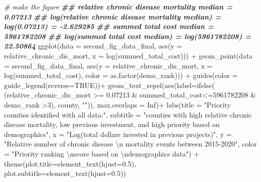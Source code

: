 \documentclass[
]{article}
\newenvironment{Shaded}{\begin{snugshade}}{\end{snugshade}}
\newcommand{\AttributeTok}[1]{\textcolor[rgb]{0.77,0.63,0.00}{#1}}
\newcommand{\CommentTok}[1]{\textcolor[rgb]{0.56,0.35,0.01}{\textit{#1}}}
\newcommand{\ConstantTok}[1]{\textcolor[rgb]{0.00,0.00,0.00}{#1}}
\newcommand{\DecValTok}[1]{\textcolor[rgb]{0.00,0.00,0.81}{#1}}
\newcommand{\DocumentationTok}[1]{\textcolor[rgb]{0.56,0.35,0.01}{\textbf{\textit{#1}}}}
\newcommand{\FloatTok}[1]{\textcolor[rgb]{0.00,0.00,0.81}{#1}}
\newcommand{\FunctionTok}[1]{\textcolor[rgb]{0.00,0.00,0.00}{#1}}
\newcommand{\NormalTok}[1]{#1}
\newcommand{\SpecialCharTok}[1]{\textcolor[rgb]{0.00,0.00,0.00}{#1}}
\newcommand{\StringTok}[1]{\textcolor[rgb]{0.31,0.60,0.02}{#1}}
\begin{document}
\begin{Shaded}
\begin{Highlighting}[]
\CommentTok{\# make the figure}
\DocumentationTok{\#\# relative chronic disease mortality median = 0.07213}
\DocumentationTok{\#\# log(relative chronic disease mortality median) = log(0.07213) = {-}2.629285}
\DocumentationTok{\#\# summed total cost median = 5961782208}
\DocumentationTok{\#\# log(summed total cost median) = log(5961782208) = 22.50864}
\FunctionTok{ggplot}\NormalTok{(}\AttributeTok{data =}\NormalTok{ second\_fig\_data\_final, }
       \FunctionTok{aes}\NormalTok{(}\AttributeTok{y =}\NormalTok{ relative\_chronic\_dis\_mort, }\AttributeTok{x =} \FunctionTok{log}\NormalTok{(summed\_total\_cost))) }\SpecialCharTok{+} 
\FunctionTok{geom\_point}\NormalTok{(}\AttributeTok{data =}\NormalTok{ second\_fig\_data\_final, }
           \FunctionTok{aes}\NormalTok{(}\AttributeTok{y =}\NormalTok{ relative\_chronic\_dis\_mort, }\AttributeTok{x =} \FunctionTok{log}\NormalTok{(summed\_total\_cost), }
                                   \AttributeTok{color =} \FunctionTok{as.factor}\NormalTok{(demo\_rank))) }\SpecialCharTok{+}
\FunctionTok{guides}\NormalTok{(}\AttributeTok{color =} \FunctionTok{guide\_legend}\NormalTok{(}\AttributeTok{reverse=}\ConstantTok{TRUE}\NormalTok{))}\SpecialCharTok{+}
 \FunctionTok{geom\_text\_repel}\NormalTok{(}\FunctionTok{aes}\NormalTok{(}\AttributeTok{label=}\FunctionTok{ifelse}\NormalTok{(}
\NormalTok{   (relative\_chronic\_dis\_mort }\SpecialCharTok{\textgreater{}=} \FloatTok{0.07213} \SpecialCharTok{\&}\NormalTok{ summed\_total\_cost}\SpecialCharTok{\textless{}=}\DecValTok{5961782208} 
    \SpecialCharTok{\&}\NormalTok{ demo\_rank }\SpecialCharTok{\textgreater{}}\DecValTok{3}\NormalTok{), county, }\StringTok{""}\NormalTok{)), }\AttributeTok{max.overlaps =} \ConstantTok{Inf}\NormalTok{)}\SpecialCharTok{+}
\FunctionTok{labs}\NormalTok{(}\AttributeTok{title =} \StringTok{"Priority counties identified with all data:"}\NormalTok{,}
 \AttributeTok{subtitle =} \StringTok{"counties with high relative chronic disease mortality, }
\StringTok{low previous investment, and high priority based on demographics"}\NormalTok{, }
        \AttributeTok{x =} \StringTok{"Log(total dollars invested in previous projects)"}\NormalTok{, }
        \AttributeTok{y =} 
\StringTok{"Relative number of chronic disease }\SpecialCharTok{\textbackslash{}n}\StringTok{ mortality events between 2015{-}2020"}\NormalTok{, }
        \AttributeTok{color =} \StringTok{"Priority ranking }\SpecialCharTok{\textbackslash{}n}\StringTok{score based on }\SpecialCharTok{\textbackslash{}n}\StringTok{demographics data"}\NormalTok{) }\SpecialCharTok{+}
   \FunctionTok{theme}\NormalTok{(}\AttributeTok{plot.title=}\FunctionTok{element\_text}\NormalTok{(}\AttributeTok{hjust=}\FloatTok{0.5}\NormalTok{),}
         \AttributeTok{plot.subtitle=}\FunctionTok{element\_text}\NormalTok{(}\AttributeTok{hjust=}\FloatTok{0.5}\NormalTok{))}
\end{Highlighting}
\end{Shaded}
\end{document}
